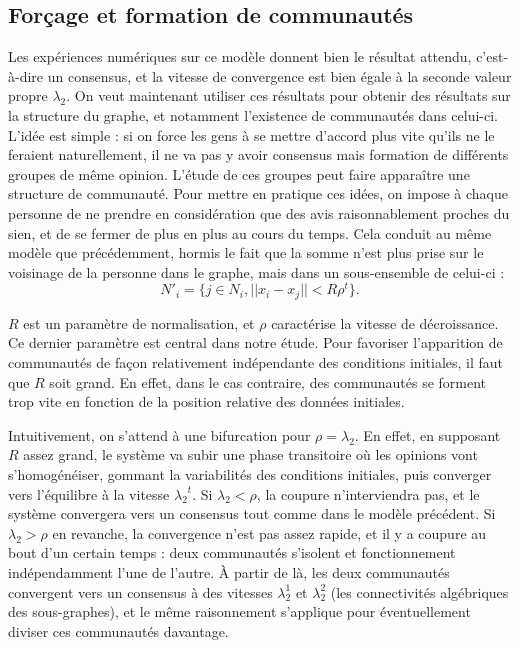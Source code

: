 \documentclass[12pt]{article}
\begin{document}
\subsection{Forçage et formation de communautés}
\label{forçage}
Les expériences numériques sur ce modèle donnent bien le résultat
attendu, c'est-à-dire un consensus, et la vitesse de convergence est
bien égale à la seconde valeur propre $\lambda_2$. On veut maintenant
utiliser ces résultats pour obtenir des résultats sur la structure du
graphe, et notamment l'existence de communautés dans celui-ci. L'idée
est simple : si on force les gens à se mettre d'accord plus vite
qu'ils ne le feraient naturellement, il ne va pas y avoir
consensus mais formation de différents groupes de même
opinion. L'étude de ces groupes peut faire apparaître une structure de
communauté. Pour mettre en pratique ces idées, on impose à chaque
personne de ne prendre en considération que des avis raisonnablement
proches du sien, et de se fermer de plus en plus au cours du
temps. Cela conduit au même modèle que précédemment, hormis le fait que la
somme n'est plus prise sur le voisinage de la personne dans le graphe,
mais dans un sous-ensemble de celui-ci : $$N'_{i} = \{j \in N_i, ||x_i
- x_j|| < R \rho^t\}.$$

$R$ est un paramètre de normalisation, et $\rho$ caractérise la vitesse de
décroissance. Ce dernier paramètre est central dans notre étude. Pour
favoriser l'apparition de communautés de façon relativement indépendante des
conditions initiales, il faut que $R$ soit grand. En effet, dans le cas
contraire, des communautés se forment trop vite en fonction de la position
relative des données initiales.

Intuitivement, on s'attend à une bifurcation pour $\rho = \lambda_2$. En
effet, en supposant $R$ assez grand, le système va subir une phase transitoire
où les opinions vont s'homogénéiser, gommant la variabilités des conditions
initiales, puis converger vers l'équilibre à la vitesse ${\lambda_2}^t$. Si
$\lambda_2 < \rho$, la coupure n'interviendra pas, et le système convergera
vers un consensus tout comme dans le modèle précédent. Si $\lambda_2 > \rho$
en revanche, la convergence n'est pas assez rapide, et il y a coupure au bout
d'un certain temps : deux communautés s'isolent et fonctionnement
indépendamment l'une de l'autre. À partir de là, les deux communautés
convergent vers un consensus à des vitesses $\lambda_2^1$ et $\lambda_2^2$
(les connectivités algébriques des sous-graphes), et le même raisonnement
s'applique pour éventuellement diviser ces communautés davantage.
\end{document}
